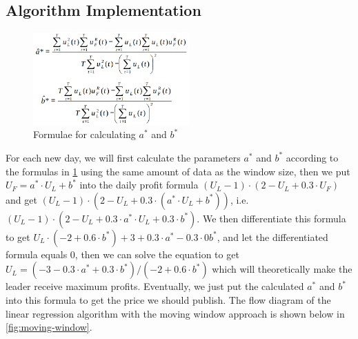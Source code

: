 \documentclass[a4paper]{article}
\begin{document}
\subsection{Algorithm Implementation}
\begin{figure}[H]
  \centering
  \includegraphics[width=6cm]{linear-formula}
  \caption{Formulae for calculating $a^*$ and $b^*$}%
  \label{fig:linear-formula}
\end{figure}

For each new day, we will first calculate the parameters $a^*$ and $b^*$
according to the formulas in \cref{fig:linear-formula} using the same amount of
data as the window size, then we put $U_F = a^* \cdot U_L + b^*$ into the daily
profit formula $(U_L - 1) \cdot (2 - U_L + 0.3 \cdot U_F)$ and get
$(U_L - 1) \cdot (2 - U_L + 0.3 \cdot (a^* \cdot U_L + b^*))$,
i.e. $(U_L - 1) \cdot (2 - U_L + 0.3 \cdot a^* \cdot U_L + 0.3 \cdot b^*)$.
We then differentiate this formula to get
$U_L \cdot (-2 + 0.6 \cdot b^*) + 3 + 0.3 \cdot a^* - 0.3 \cdot 0b^*$, and let
the differentiated formula equals 0, then we can solve the equation to get
$U_L = (-3 - 0.3 \cdot a^* + 0.3 \cdot b^*) / (-2 + 0.6 \cdot b^*)$ which will
theoretically make the leader receive maximum profits.
Eventually, we just put the calculated $a^*$ and $b^*$ into this formula to get
the price we should publish.
The flow diagram of the linear regression algorithm with the moving window
approach is shown below in \cref{fig:moving-window}.
\end{document}
